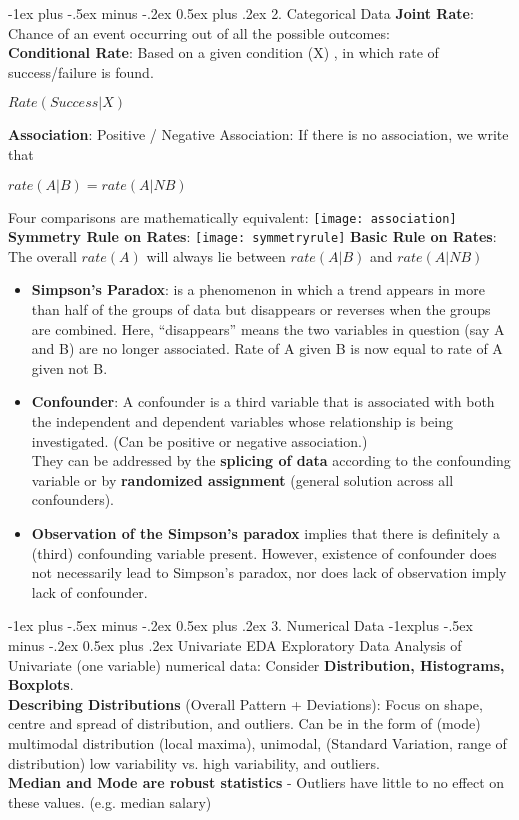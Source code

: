 \documentclass[10pt, landscape]{article}
\makeatletter
\renewcommand{\section}{\@startsection{section}{1}{0mm}%
                                {-1ex plus -.5ex minus -.2ex}%
                                {0.5ex plus .2ex}%
                                {\normalfont\large\bfseries}}
\renewcommand{\subsection}{\@startsection{subsection}{2}{0mm}%
                                {-1explus -.5ex minus -.2ex}%
                                {0.5ex plus .2ex}%
                                {\normalfont\normalsize\bfseries}}
\makeatother
\begin{document}
\begin{multicols*}{4}
\section{2. Categorical Data}
	\textbf{Joint Rate}: Chance of an event occurring out of all the possible outcomes:\\
	\textbf{Conditional Rate}: Based on a given condition (X) , in which rate of success/failure is found. \\
	\centerline	{$ Rate(Success | X) $ } 
	\textbf{Association}: Positive / Negative Association: If there is no association, we write that
	\centerline { $rate(A|B) = rate(A|NB)$ } 
	Four comparisons are mathematically equivalent:
	\texttt{[image: association]}
	\textbf{Symmetry Rule on Rates}:
	\texttt{[image: symmetryrule]}
	\textbf{Basic Rule on Rates}: The overall $rate(A)$ will always lie between $rate(A|B)$ and $rate(A \rvert NB)$

\begin{itemize}
	\item \textbf{Simpson's Paradox}: is a phenomenon in which a trend appears in more than half of the groups of data but disappears or reverses when the groups are combined. Here, “disappears” means the two variables in question (say A and B) are no longer associated. Rate of A given B is now equal to rate of A given not B. 
	\item \textbf{Confounder}: A confounder is a third variable that is associated with both the independent and
dependent variables whose relationship is being investigated. (Can be positive or negative association.) \\
They can be addressed by the \textbf{splicing of data} according to the confounding variable or by \textbf{randomized assignment} (general solution across all confounders). 
	\item \textbf{Observation of the Simpson's paradox} implies that there is definitely a (third) confounding variable present. However, existence of confounder does not necessarily lead to Simpson's paradox, nor does lack of observation imply lack of confounder.
\end{itemize}

\section{3. Numerical Data}
\subsection{Univariate EDA}
	Exploratory Data Analysis of Univariate (one variable) numerical data: Consider \textbf{Distribution, Histograms, Boxplots}. \\
	\textbf{Describing Distributions} (Overall Pattern + Deviations): Focus on shape, centre and spread of distribution, and outliers. Can be in the form of (mode) multimodal distribution (local maxima), unimodal, (Standard Variation, range of distribution) low variability vs. high variability, and outliers. \\
	\textbf{Median and Mode are robust statistics} - Outliers have little to no effect on these values. (e.g. median salary) 

\end{multicols*}
\end{document}
